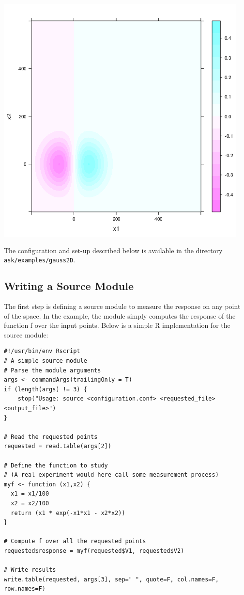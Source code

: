 \begin{center}
  \includegraphics[width=\textwidth]{figures/ASK-gauss2D-ideal.png}
\end{center}



The configuration and set-up described below is available in the directory \texttt{ask/examples/gauss2D}.

\subsection{Writing a Source Module}

The first step is defining a source module to measure the response on any point of the space.
In the example, the module simply computes the response of the function f over the input points.
Below is a simple R implementation for the source module:

\begin{verbatim}
#!/usr/bin/env Rscript
# A simple source module
# Parse the module arguments
args <- commandArgs(trailingOnly = T)
if (length(args) != 3) {
    stop("Usage: source <configuration.conf> <requested_file> <output_file>")
}

# Read the requested points
requested = read.table(args[2])

# Define the function to study
# (A real experiment would here call some measurement process)
myf <- function (x1,x2) {
  x1 = x1/100
  x2 = x2/100
  return (x1 * exp(-x1*x1 - x2*x2))
}

# Compute f over all the requested points
requested$response = myf(requested$V1, requested$V2)

# Write results
write.table(requested, args[3], sep=" ", quote=F, col.names=F, row.names=F)
\end{verbatim}

